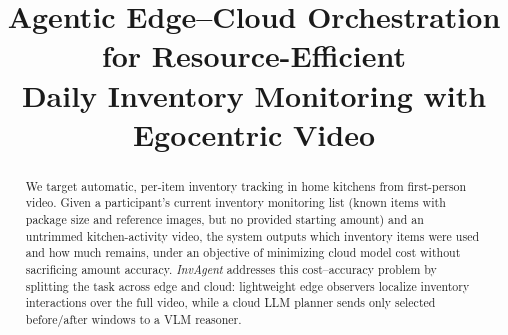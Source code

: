 \documentclass[sigconf,anonymous,nonacm]{acmart}
\newcommand{\scaffold}[1]{\textcolor{red}{#1}}
\newcommand{\sys}{\textit{InvAgent}\xspace}
\begin{document}
\title{Agentic Edge–Cloud Orchestration for Resource-Efficient \\ Daily Inventory Monitoring with Egocentric Video}



\begin{abstract}
We target automatic, per-item inventory tracking in home kitchens from
first-person video. Given a participant's current inventory monitoring
list (known items with package size and reference images, but no
provided starting amount) and an untrimmed kitchen-activity video, the
system outputs which inventory items were used and how much remains,
under an objective of minimizing cloud model cost without sacrificing
amount accuracy. \sys addresses this cost--accuracy problem by
splitting the task across edge and cloud: lightweight edge observers
localize inventory interactions over the full video, while a cloud LLM
planner sends only selected before/after windows to a VLM reasoner.

\end{abstract}
\end{document}
